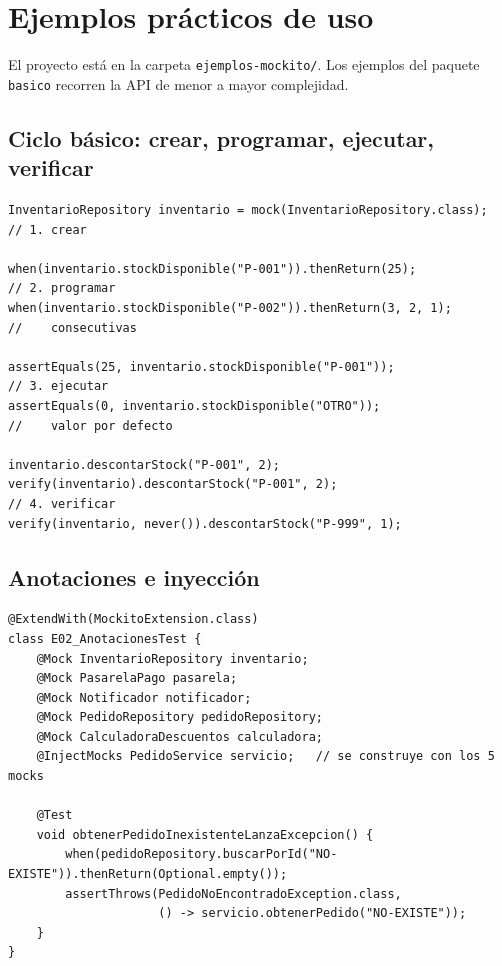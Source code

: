 \documentclass[11pt,a4paper,oneside]{report}
\newcommand{\code}[1]{\texttt{#1}}
\begin{document}
\chapter{Ejemplos prácticos de uso}

El proyecto está en la carpeta \code{ejemplos-mockito/}. Los ejemplos del paquete \code{basico} recorren la API de menor a mayor complejidad.

\section{Ciclo básico: crear, programar, ejecutar, verificar}
\begin{lstlisting}[caption={\code{E01\_PrimerMockTest} (extracto)}]
InventarioRepository inventario = mock(InventarioRepository.class);   // 1. crear

when(inventario.stockDisponible("P-001")).thenReturn(25);             // 2. programar
when(inventario.stockDisponible("P-002")).thenReturn(3, 2, 1);        //    consecutivas

assertEquals(25, inventario.stockDisponible("P-001"));                // 3. ejecutar
assertEquals(0, inventario.stockDisponible("OTRO"));                  //    valor por defecto

inventario.descontarStock("P-001", 2);
verify(inventario).descontarStock("P-001", 2);                        // 4. verificar
verify(inventario, never()).descontarStock("P-999", 1);
\end{lstlisting}

\section{Anotaciones e inyección}
\begin{lstlisting}[caption={\code{E02\_AnotacionesTest} (extracto)}]
@ExtendWith(MockitoExtension.class)
class E02_AnotacionesTest {
    @Mock InventarioRepository inventario;
    @Mock PasarelaPago pasarela;
    @Mock Notificador notificador;
    @Mock PedidoRepository pedidoRepository;
    @Mock CalculadoraDescuentos calculadora;
    @InjectMocks PedidoService servicio;   // se construye con los 5 mocks

    @Test
    void obtenerPedidoInexistenteLanzaExcepcion() {
        when(pedidoRepository.buscarPorId("NO-EXISTE")).thenReturn(Optional.empty());
        assertThrows(PedidoNoEncontradoException.class,
                     () -> servicio.obtenerPedido("NO-EXISTE"));
    }
}
\end{lstlisting}
\end{document}

